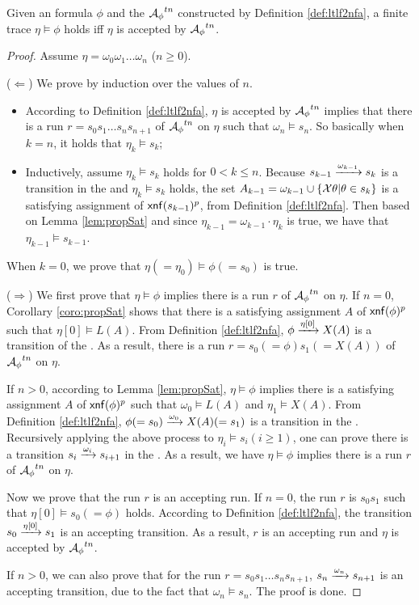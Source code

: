 \begin{theorem}\label{thm:ltlf2nfa}
Given an \ltlf formula $\phi$ and the \TNFA ${\mathcal{A}_{\phi}}^{tn}$ constructed by Definition \ref{def:ltlf2nfa}, a finite trace $\eta\models\phi$ holds iff $\eta$ is accepted by ${\mathcal{A}_{\phi}}^{tn}$. 
\end{theorem}
\begin{proof}
Assume $\eta = \omega_0\omega_1\ldots\omega_n$ ($n\geq 0$). 

($\Leftarrow$) We prove by induction over the values of $n$.
\begin{itemize}
	\item According to Definition \ref{def:ltlf2nfa}, $\eta$ is accepted by ${\mathcal{A}_{\phi}}^{tn}$ implies that there is a run $r=s_0s_1\ldots s_n s_{n+1}$ of ${\mathcal{A}_{\phi}}^{tn}$ on $\eta$ such that $\omega_n\models s_{n}$. So basically when $k = n$, it holds that $\eta_k\models s_k$;
	\item Inductively, assume $\eta_k\models s_k$ holds for $0<k\leq n$. Because $s_{k-1}\xrightarrow[]{\omega_{k-1}}s_k$ is a transition in the \TNFA and $\eta_k\models s_k$ holds, the set $A_{k-1} = \omega_{k-1}\cup \{\mathcal{X}\theta | \theta\in s_k\}$ is a satisfying assignment of ${\sf xnf}(s_{k-1})^p$, from Definition \ref{def:ltlf2nfa}. Then based on Lemma \ref{lem:propSat} and since $\eta_{k-1}=\omega_{k-1}\cdot\eta_k$ is true, we have that $\eta_{k-1}\models s_{k-1}$.
\end{itemize}
When $k=0$, we prove that $\eta (=\eta_0)\models \phi (=s_0)$ is true.

($\Rightarrow$) We first prove that $\eta\models\phi$ implies there is a run $r$ of ${\mathcal{A}_{\phi}}^{tn}$ on $\eta$. 
If $n = 0$, Corollary \ref{coro:propSat} shows that there is a satisfying assignment $A$ of ${\sf xnf}(\phi)^p$ such that $\eta[0]\models L(A)$. From Definition \ref{def:ltlf2nfa}, $\phi\xrightarrow[]{\eta[0]}X(A)$ is a transition of the \TNFA. As a result, there is a run $r=s_0(=\phi)s_1(=X(A))$ of ${\mathcal{A}_{\phi}}^{tn}$ on $\eta$.
 
If $n>0$, according to Lemma \ref{lem:propSat}, $\eta\models\phi$ implies there is a satisfying assignment $A$ of ${\sf xnf}(\phi)^p$ such that $\omega_0\models L(A)$ and $\eta_1\models X(A)$. From Definition \ref{def:ltlf2nfa}, $\phi (=s_0)\xrightarrow[]{\omega_0}X(A) (=s_1)$ is a transition in the \TNFA. Recursively applying the above process to $\eta_i\models s_i(i\geq 1)$, one can prove there is a transition $s_i\xrightarrow[]{\omega_i}s_{i+1}$ in the \TNFA. As a result, we have $\eta\models\phi$ implies there is a run $r$ of ${\mathcal{A}_{\phi}}^{tn}$ on $\eta$.  

Now we prove that the run $r$ is an accepting run. If $n=0$, the run $r$ is $s_0s_1$ such that $\eta[0]\models s_0(=\phi)$ holds. According to Definition \ref{def:ltlf2nfa}, the transition $s_0\xrightarrow[]{\eta[0]}s_1$ is an accepting transition. As a result, $r$ is an accepting run and $\eta$ is accepted by ${\mathcal{A}_{\phi}}^{tn}$.

If $n>0$, we can also prove that for the run $r=s_0s_1\ldots s_n s_{n+1}$, $s_n\xrightarrow[]{\omega_n}s_{n+1}$ is an accepting transition, due to the fact that $\omega_n\models s_n$. The proof is done.
\end{proof}

